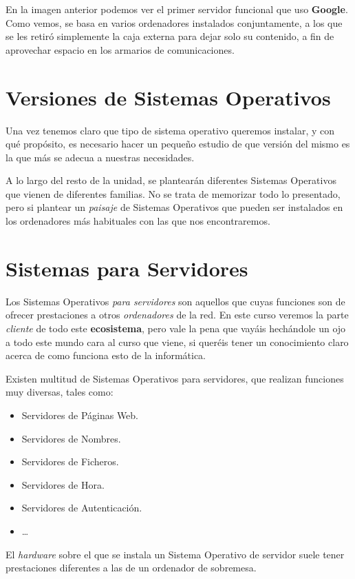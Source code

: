 \documentclass[11pt]{article}
\begin{document}
En la imagen anterior podemos ver el primer servidor funcional que uso
\textbf{Google}. Como vemos, se basa en varios ordenadores instalados
conjuntamente, a los que se les retiró simplemente la caja externa para
dejar solo su contenido, a fin de aprovechar espacio en los armarios de
comunicaciones.

\section{Versiones de Sistemas Operativos}
\label{sec:org0ddaa97}
Una vez tenemos claro que tipo de sistema operativo queremos instalar, y
con qué propósito, es necesario hacer un pequeño estudio de que versión
del mismo es la que más se adecua a nuestras necesidades.

A lo largo del resto de la unidad, se plantearán diferentes Sistemas Operativos
que vienen de diferentes familias. No se trata de memorizar todo lo presentado,
pero si plantear un \emph{paisaje} de Sistemas Operativos que pueden ser instalados
en los ordenadores más habituales con las que nos encontraremos.

\section{Sistemas para Servidores}
\label{sec:orgf7b51bf}
Los Sistemas Operativos \emph{para servidores} son aquellos que cuyas funciones son 
de ofrecer prestaciones a otros \emph{ordenadores} de la red. En este curso veremos 
la parte \emph{cliente} de todo este \textbf{ecosistema}, pero vale la pena que vayáis hechándole
un ojo a todo este mundo cara al curso que viene, si queréis tener un conocimiento
claro acerca de como funciona esto de la informática.

Existen multitud de Sistemas Operativos para servidores, que realizan funciones muy diversas, 
tales como:

\begin{itemize}
\item Servidores de Páginas Web.
\item Servidores de Nombres.
\item Servidores de Ficheros.
\item Servidores de Hora.
\item Servidores de Autenticación.
\item \ldots{}
\end{itemize}

El \emph{hardware} sobre el que se instala un Sistema Operativo de servidor
suele tener prestaciones diferentes a las de un ordenador de sobremesa.
\end{document}
